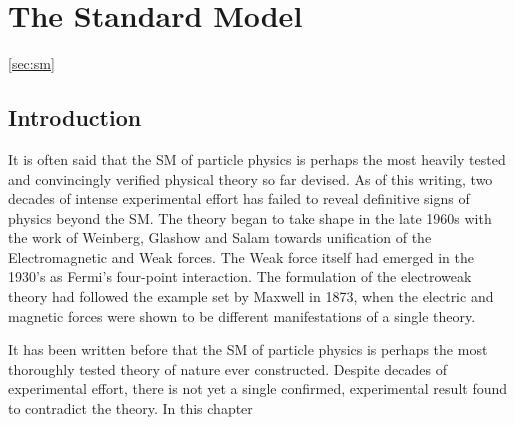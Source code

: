 
\chapter{The Standard Model}
\ref{sec:sm}
\section{Introduction}
It is often said that the \acl{SM} of particle physics is perhaps the most
heavily tested and convincingly verified physical theory so far devised. As of
this writing, two decades of intense experimental effort has failed to reveal
definitive signs of physics beyond the \ac{SM}. The theory began to take shape
in the late 1960s with the work of Weinberg, Glashow and Salam towards
unification of the Electromagnetic and Weak forces. The Weak force itself had
emerged in the 1930's as Fermi's four-point interaction. The formulation of the
electroweak theory had followed the example set by Maxwell in 1873, when the
electric and magnetic forces were shown to be different manifestations of a
single theory.

It has been written before that the \acl{SM} of particle
physics is perhaps the most thoroughly tested theory of nature ever
constructed. Despite decades of experimental effort, there is not yet a single
confirmed, experimental result found to contradict the theory. In this chapter
